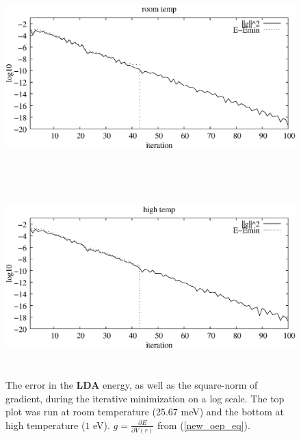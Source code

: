 \documentclass[12pt]{iopart}
\begin{document}
\begin{figure}
\centerline{\includegraphics[height=3in]{cvg_room.eps}}
\centerline{\includegraphics[height=3in]{cvg_1eV.eps}}
\caption{The error in the {\bf LDA} energy, as well as the square-norm of gradient,
during the iterative minimization on a log scale.  The top plot
was run at room temperature ($25.67$ meV) and the bottom at
high temperature ($1$ eV).  $g = \frac{\partial E}{\partial V(r)}$ from
(\ref{new_oep_eq}).
}
\label{energy_convergence}
\end{figure}
\end{document}
